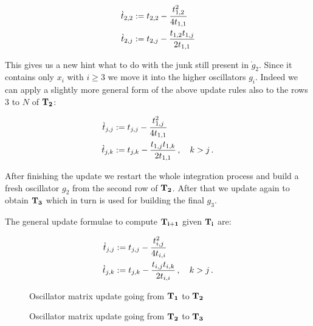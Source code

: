 \documentclass[a4paper,10pt]{article}
\begin{document}
\begin{equation}
\begin{split}
  \grave{t}_{2,2} & := t_{2,2} - \frac{t_{1,2}^2}{4 t_{1,1}} \\
  \grave{t}_{2,j} & := t_{2,j} - \frac{t_{1,2} t_{1,j}}{2 t_{1,1}}
\end{split}
\end{equation}

This gives us a new hint what to do with the junk still present in $\grave{g}_2$.
Since it contains only $x_i$ with $i \geq 3$ we move it into the higher
oscillators $g_i$. Indeed we can apply a slightly more general form of the
above update rules also to the rows $3$ to $N$ of $\mathbf{T_2}$:

\begin{equation}
\begin{split}
  \grave{t}_{j,j} & := t_{j,j} - \frac{t_{1,j}^2}{4 t_{1,1}} \\
  \grave{t}_{j,k} & := t_{j,k} - \frac{t_{1,j} t_{1,k}}{2 t_{1,1}} \,, \quad k > j \,.
\end{split}
\end{equation}

After finishing the update we restart the whole integration process and build
a fresh oscillator $g_2$ from the second row of $\mathbf{T_2}$. After that we update
again to obtain $\mathbf{T_3}$ which in turn is used for building the final $g_3$.

The general update formulae to compute $\mathbf{T_{i+1}}$ given $\mathbf{T_i}$ are:

\begin{equation}
\begin{split}
  \grave{t}_{j,j} & := t_{j,j} - \frac{t_{i,j}^2}{4 t_{i,i}} \\
  \grave{t}_{j,k} & := t_{j,k} - \frac{t_{i,j} t_{i,k}}{2 t_{i,i}} \,, \quad k > j \,.
\end{split}
\end{equation}

\begin{figure}
  \centering
  \subfloat[][]{
    
  }
  \qquad
  \subfloat[][]{
    
  }
\caption{Oscillator matrix update going from $\mathbf{T_1}$ to $\mathbf{T_2}$}
\label{fig:oscillator_update_T1}
\end{figure}

\begin{figure}
  \centering
  \subfloat[][]{
    
  }
  \qquad
  \subfloat[][]{
    
  }
\caption{Oscillator matrix update going from $\mathbf{T_2}$ to $\mathbf{T_3}$}
\label{fig:oscillator_update_T2}
\end{figure}
\end{document}
